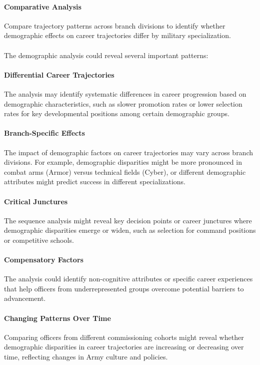 \documentclass[../main.tex]{subfiles}
\begin{document}
\paragraph{Comparative Analysis} Compare trajectory patterns across branch divisions to identify whether demographic effects on career trajectories differ by military specialization.


\paragraph{} The demographic analysis could reveal several important patterns:

\paragraph{Differential Career Trajectories} The analysis may identify systematic differences in career progression based on demographic characteristics, such as slower promotion rates or lower selection rates for key developmental positions among certain demographic groups.

\paragraph{Branch-Specific Effects} The impact of demographic factors on career trajectories may vary across branch divisions. For example, demographic disparities might be more pronounced in combat arms (Armor) versus technical fields (Cyber), or different demographic attributes might predict success in different specializations.

\paragraph{Critical Junctures} The sequence analysis might reveal key decision points or career junctures where demographic disparities emerge or widen, such as selection for command positions or competitive schools.

\paragraph{Compensatory Factors} The analysis could identify non-cognitive attributes or specific career experiences that help officers from underrepresented groups overcome potential barriers to advancement.

\paragraph{Changing Patterns Over Time} Comparing officers from different commissioning cohorts might reveal whether demographic disparities in career trajectories are increasing or decreasing over time, reflecting changes in Army culture and policies.
\end{document}
